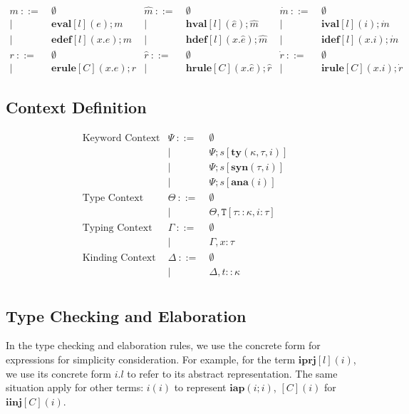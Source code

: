 \documentclass{sig-alternate}
\newcommand{\T}{\mathtt{T}}
\begin{document}
\[\begin{array}{rlrlrl}
  m       ~::=&~ \emptyset            &\hat{m}  ~::=&~ \emptyset                &\dot{m}  ~::=&~ \emptyset\\
        | ~ &~ \mathbf{eval}[l](e);m      &     | ~ &~ \mathbf{hval}[l](\hat{e});\hat{m}    &     | ~ &~ \mathbf{ival}[l](i);\dot{m}\\
        | ~ &~ \mathbf{edef}[l](x.e);m      &     | ~ &~ \mathbf{hdef}[l](x.\hat{e});\hat{m}    &     | ~ &~ \mathbf{idef}[l](x.i);\dot{m}\\
  r       ~::=&~ \emptyset            &\hat{r}  ~::=&~ \emptyset                &\dot{r}  ~::=&~ \emptyset\\
        | ~ &~ \mathbf{erule}[C](x.e);r     &       | ~ &~ \mathbf{hrule}[C](x.\hat{e});\hat{r}   &     | ~ &~ \mathbf{irule}[C](x.i);\dot{r}
\end{array}
\]
\subsection{Context Definition}
\[
\begin{array}{rrl}
\text{Keyword Context}  & \Psi  ~::=&~  \emptyset\\
            &     | ~ &~  \Psi;s[\mathbf{ty}(\kappa,\tau,i)]\\
            &     | ~ &~  \Psi;s[\mathbf{syn}(\tau,i)]\\
            &     | ~ &~  \Psi;s[\mathbf{ana}(i)]\\
\text{Type Context}   & \Theta  ~::=&~ \emptyset\\
            &     | ~ &~ \Theta,\T[\tau::\kappa,i:\tau] \\
\text{Typing Context} & \Gamma  ~::=&~ \emptyset\\
            &     | ~ &~ \Gamma,x:\tau\\
\text{Kinding Context}  &   \Delta  ~::=&~ \emptyset\\
            &       | ~ &~ \Delta,t::\kappa\\
\end{array}
\]

\subsection{Type Checking and Elaboration}
In the type checking and elaboration rules, we use the concrete form for expressions for simplicity consideration. For example, for the term $\mathbf{iprj}[l](i)$, we use its concrete form $i.l$ to refer to its abstract representation. The same situation apply for other terms: $i(i)$ to represent $\mathbf{iap}(i;i)$, $[C](i)$ for $\mathbf{iinj}[C](i)$.
\end{document}
